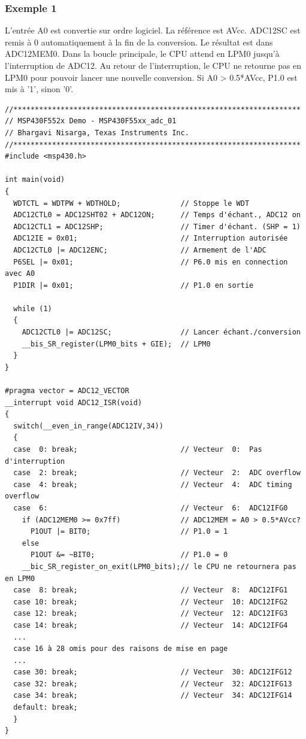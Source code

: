 \begin{minipage}{16cm}{
\subsubsection*{Exemple 1}
L'entrée A0 est convertie sur ordre logiciel. La référence est AVcc. ADC12SC est remis à 0 automatiquement à la fin de la conversion. Le résultat est dans ADC12MEM0. Dans la boucle principale, le CPU attend en LPM0 jusqu'à l'interruption de ADC12. Au retour de l'interruption, le CPU ne retourne pas en LPM0 pour pouvoir lancer une nouvelle conversion. Si A0 > 0.5*AVcc, P1.0 est mis à '1', sinon '0'.

\lstset{style=customc}
\begin{lstlisting}
//*******************************************************************
// MSP430F552x Demo - MSP430F55xx_adc_01
// Bhargavi Nisarga, Texas Instruments Inc.
//*******************************************************************
#include <msp430.h>

int main(void)
{
  WDTCTL = WDTPW + WDTHOLD;              // Stoppe le WDT
  ADC12CTL0 = ADC12SHT02 + ADC12ON;      // Temps d'échant., ADC12 on
  ADC12CTL1 = ADC12SHP;                  // Timer d'échant. (SHP = 1)
  ADC12IE = 0x01;                        // Interruption autorisée
  ADC12CTL0 |= ADC12ENC;                 // Armement de l'ADC
  P6SEL |= 0x01;                         // P6.0 mis en connection avec A0
  P1DIR |= 0x01;                         // P1.0 en sortie

  while (1)
  {
    ADC12CTL0 |= ADC12SC;                // Lancer échant./conversion
    __bis_SR_register(LPM0_bits + GIE);  // LPM0
  }
}

#pragma vector = ADC12_VECTOR
__interrupt void ADC12_ISR(void)
{
  switch(__even_in_range(ADC12IV,34))
  {
  case  0: break;                        // Vecteur  0:  Pas d'interruption
  case  2: break;                        // Vecteur  2:  ADC overflow
  case  4: break;                        // Vecteur  4:  ADC timing overflow
  case  6:                               // Vecteur  6:  ADC12IFG0
    if (ADC12MEM0 >= 0x7ff)              // ADC12MEM = A0 > 0.5*AVcc?
      P1OUT |= BIT0;                     // P1.0 = 1
    else
      P1OUT &= ~BIT0;                    // P1.0 = 0
    __bic_SR_register_on_exit(LPM0_bits);// le CPU ne retournera pas en LPM0
  case  8: break;                        // Vecteur  8:  ADC12IFG1
  case 10: break;                        // Vecteur  10: ADC12IFG2
  case 12: break;                        // Vecteur  12: ADC12IFG3
  case 14: break;                        // Vecteur  14: ADC12IFG4
  ...
  case 16 à 28 omis pour des raisons de mise en page
  ...
  case 30: break;                        // Vecteur  30: ADC12IFG12
  case 32: break;                        // Vecteur  32: ADC12IFG13
  case 34: break;                        // Vecteur  34: ADC12IFG14
  default: break; 
  }
}
\end{lstlisting}
}
\end{minipage}

